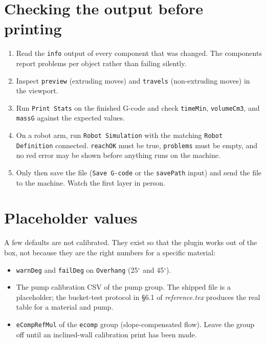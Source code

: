 \documentclass[11pt]{article}
\newcommand{\param}[1]{\texttt{#1}}
\newcommand{\iamdeg}{$^{\circ}$}
\begin{document}
\section{Checking the output before printing}

\begin{enumerate}
  \item Read the \param{info} output of every component that was changed. The components report problems per object rather than failing silently.
  \item Inspect \param{preview} (extruding moves) and \param{travels} (non-extruding moves) in the viewport.
  \item Run \param{Print Stats} on the finished G-code and check \param{timeMin}, \param{volumeCm3}, and \param{massG} against the expected values.
  \item On a robot arm, run \param{Robot Simulation} with the matching \param{Robot Definition} connected. \param{reachOK} must be true, \param{problems} must be empty, and no red error may be shown before anything runs on the machine.
  \item Only then save the file (\param{Save G-code} or the \param{savePath} input) and send the file to the machine. Watch the first layer in person.
\end{enumerate}

\section{Placeholder values}

A few defaults are not calibrated. They exist so that the plugin works
out of the box, not because they are the right numbers for a specific
material:

\begin{itemize}
  \item \param{warnDeg} and \param{failDeg} on \param{Overhang} (25\iamdeg{} and 45\iamdeg).
  \item The pump calibration CSV of the pump group. The shipped file is a placeholder; the bucket-test protocol in \S 6.1 of \emph{reference.tex} produces the real table for a material and pump.
  \item \param{eCompRefMul} of the \param{ecomp} group (slope-compensated flow). Leave the group off until an inclined-wall calibration print has been made.
\end{itemize}
\end{document}
